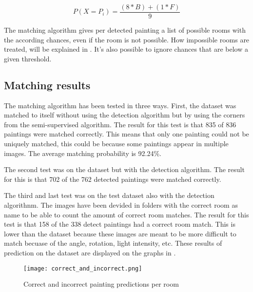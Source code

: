 \begin{equation}
    \label{eq:histogram-score}
    P(X = P_{i}) = \frac{(8 * B) + (1 * F)}{9}
\end{equation}

The matching algorithm gives per detected painting a list of possible rooms with the according chances, even if the room is not possible. How impossible rooms are treated, will be explained in . It's also possible to ignore chances that are below a given threshold.

\subsection{Matching results}
The matching algorithm has been tested in three ways. First, the dataset was matched to itself without using the detection algorithm but by using the corners from the semi-supervised algorithm. The result for this test is that 835 of 836 paintings were matched correctly. This means that only one painting could not be uniquely matched, this could be because some paintings appear in multiple images. The average matching probability is 92.24\%.

The second test was on the dataset but with the detection algorithm. The result for this is that 702 of the 762 detected paintings were matched correctly.

The third and last test was on the test dataset also with the detection algorithnm. The images have been devided in folders with the correct room as name to be able to count the amount of correct room matches. The result for this test is that 158 of the 338 detect paintings had a correct room match. This is lower than the dataset because these images are meant to be more difficult to match becuase of the angle, rotation, light intensity, etc. These results of prediction on the dataset are displayed on the graphs in .

\begin{figure}
    \centering
    \texttt{[image: correct\_and\_incorrect.png]}

    \caption{Correct and incorrect painting predictions per room}
    \label{fig:correct-incorrect-paintings}
\end{figure}
